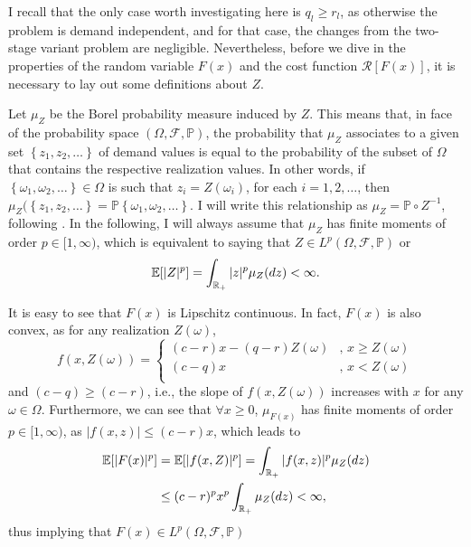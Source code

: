 \documentclass[12pt]{article}
\begin{document}
I recall that the only case worth investigating here is $q_l \ge r_l$, as otherwise the problem is demand independent, and for that case, the changes from the two-stage variant problem are negligible.
Nevertheless, before we dive in the properties of the random variable $F(x)$ and the cost function $\mathcal{R}[F(x)]$, it is necessary to lay out some definitions about $Z$.

Let $\mu_Z$ be the Borel probability measure induced by $Z$.
This means that, in face of the probability space $\left( \Omega,\mathcal{F},\mathbb{P} \right)$, the probability that $\mu_Z$ associates to a given set $\left\{ z_1,z_2,\ldots \right\} $ of demand values is equal to the probability of the subset of $\Omega$ that contains the respective realization values. 
In other words, if $\left\{ \omega_1,\omega_2,\ldots \right\}\in \Omega$ is such that $z_i=Z(\omega_i)$, for each $i=1,2,\ldots$, then $\mu_Z(\left\{ z_1,z_2,\ldots \right\} = \mathbb{P}\left\{ \omega_1,\omega_2,\ldots \right\}$.
I will write this relationship as $\mu_Z = \mathbb{P} \circ Z^{-1}$, following \citet{burtscheidtBilevelLinearOptimization2020}.
In the following, I will always assume that $\mu_Z$ has finite moments of order $p\in [1,\infty)$, which is equivalent to saying that $Z \in L^{p}\left( \Omega, \mathcal{F},\mathbb{P} \right)$ or \[
    \mathbb{E}[|Z|^{p}] = \int_{\mathbb{R}_{+}} |z|^{p} \mu_Z(dz) < \infty
.\]

It is easy to see that $F(x)$ is Lipschitz continuous.
In fact, $F(x)$ is also convex, as for any realization $Z(\omega)$, \[
    f(x,Z(\omega)) = \begin{cases}
	(c-r)x - (q-r)Z(\omega) &,\, x \ge Z(\omega) \\
	(c-q)x &,\, x < Z(\omega) \\
    \end{cases}
\] and $(c-q) \ge (c-r)$, i.e., the slope of $f(x,Z(\omega))$ increases with $x$ for any $\omega \in \Omega$.
Furthermore, we can see that $\forall x\ge 0$, $\mu_{F(x)}$ has finite moments of order $p\in [1,\infty)$, as $|f(x,z)| \le (c-r)x$, which leads to
\begin{align*}
    \mathbb{E}[|F(x)|^{p}] &= \mathbb{E}[|f(x,Z)|^{p}] = \int_{\mathbb{R}_{+}} |f(x,z)|^{p} \mu_Z(dz) \\
    &\le  (c-r)^{p} x^{p} \int_{\mathbb{R}_{+}} \mu_Z(dz) < \infty
,\end{align*}
thus implying that $F(x) \in L^{p}\left(\Omega, \mathcal{F}, \mathbb{P}\right)$
\end{document}
